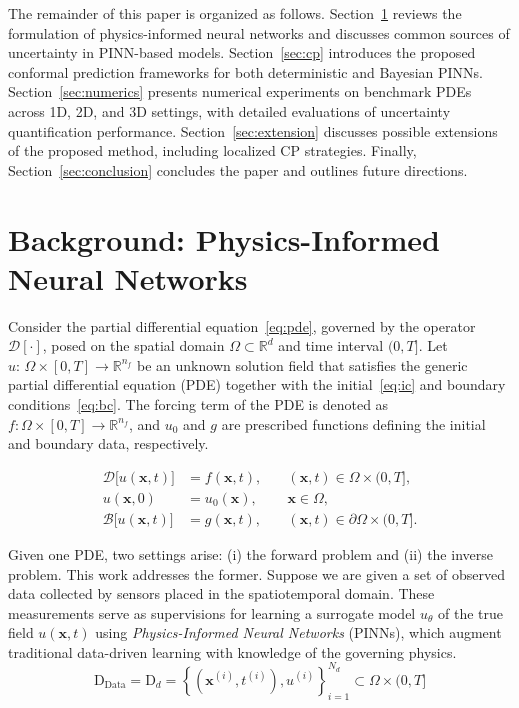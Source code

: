 \documentclass[preprint,12pt]{elsarticle}
\begin{document}
% 
The remainder of this paper is organized as follows. Section~\ref{sec:pinn} reviews the formulation of physics-informed neural networks and discusses common sources of uncertainty in PINN-based models. Section~\ref{sec:cp} introduces the proposed conformal prediction frameworks for both deterministic and Bayesian PINNs. Section~\ref{sec:numerics} presents numerical experiments on benchmark PDEs across 1D, 2D, and 3D settings, with detailed evaluations of uncertainty quantification performance. Section~\ref{sec:extension} discusses possible extensions of the proposed method, including localized CP strategies. Finally, Section~\ref{sec:conclusion} concludes the paper and outlines future directions.

\section{Background: Physics-Informed Neural Networks}
\label{sec:pinn}

Consider the partial differential equation~\eqref{eq:pde}, governed by the operator $\mathcal{D}[\cdot]$, posed on the spatial domain $\Omega\subset\mathbb{R}^d$ and time interval $(0,T]$. Let $u:\,\Omega\times[0,T]\to\mathbb{R}^{n_f}$ be an unknown solution field that satisfies the generic partial differential equation (PDE) together with the initial~\eqref{eq:ic} and boundary conditions~\eqref{eq:bc}. The forcing term of the PDE is denoted as $f:\Omega\times[0,T]\to\mathbb{R}^{n_f}$, and $u_0$ and $g$ are prescribed functions defining the initial and boundary data, respectively.

\begin{align}
  \mathcal{D}\bigl[u(\mathbf{x},t)\bigr] &= f(\mathbf{x},t),
  &\quad (\mathbf{x},t)\in\Omega\times(0,T], \label{eq:pde} \\[4pt]
  u(\mathbf{x},0) &= u_0(\mathbf{x}),
  &\quad \mathbf{x}\in\Omega, \label{eq:ic} \\[4pt]
  \mathcal{B}\!\bigl[u(\mathbf{x},t)\bigr] &= g(\mathbf{x},t),
  &\quad (\mathbf{x},t)\in\partial\Omega\times(0,T]. \label{eq:bc}
\end{align}


Given one PDE, two settings arise: (i) the forward problem and (ii) the inverse problem. This work addresses the former. Suppose we are given a set of observed data collected by sensors placed in the spatiotemporal domain. These measurements serve as supervisions for learning a surrogate model $u_\theta$ of the true field $u(\mathbf{x}, t)$ using \textit{Physics-Informed Neural Networks} (PINNs), which augment traditional data-driven learning with knowledge of the governing physics.
\[
\text{D}_{\text{Data}} = \text{D}_d = \left\{(\mathbf{x}^{(i)}, t^{(i)}), u^{(i)}\right\}_{i=1}^{N_d} \subset \Omega \times (0,T]
\]
\end{document}
